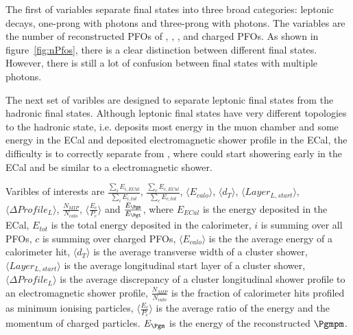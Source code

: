 \documentclass[a4paper,11pt]{article}
\begin{document}
The first of variables separate final states into three broad categories: leptonic decays, one-prong with photons and three-prong with photons. The variables are the number of reconstructed PFOs of \PGmpm, \Pepm, \PGg, \PGppm and charged PFOs. As shown in figure~\ref{fig:nPfos}, there is a clear distinction between different final states. However, there is still  a lot of confusion between final states with multiple photons.


The next set of varibles are designed to separate leptonic final states from the hadronic final states. Although leptonic final states have very different topologies to the hadronic state, i.e. \PGmpm deposits most energy in the muon chamber and some energy in the ECal and \Pepm deposited electromagnetic shower profile in the ECal, the difficulty is to correctly separate \Pepm from \PGppm, where \PGppm could start showering early in the ECal and be similar to a electromagnetic shower.

Varibles of interests are $\frac{\sum_{i}{E_{i,ECal}}}{\sum_{i}{E_{i,tot}}}$, $\frac{\sum_{c}{E_{c,ECal}}}{\sum_{c}{E_{c,tot}}}$, $\langle{E_{calo}}\rangle$, $\langle{d_{T}}\rangle$, $\langle{Layer_{L,start}}\rangle$, $\langle\Delta{Profile_{L}}\rangle$, $\frac{N_{MIP}}{N_{calo}}$,  $\langle{\frac{E_{c}}{P_{c}}}\rangle$ and  $\frac{E_{\Pmu}}{E_{\Ptau}}$, where $E_{ECal}$ is the energy deposited in the ECal,  $E_{tot}$ is the total energy deposited in the calorimeter, $i$ is summing over all PFOs, $c$ is summing over charged PFOs, $\langle{E_{calo}}\rangle$ is the the average energy of a calorimeter hit, $\langle{d_{T}}\rangle$ is the average transverse width of a cluster shower, $\langle{Layer_{L,start}}\rangle$ is the average longitudinal start layer of a cluster shower, $\langle\Delta{Profile_{L}}\rangle$ is the average discrepancy of a  cluster longitudinal shower profile to an electromagnetic shower profile, $\frac{N_{MIP}}{N_{calo}}$ is the fraction of calorimeter hits profiled as minimum ionising particles, $\langle{\frac{E_{c}}{P_{c}}}\rangle$ is the average ratio of the energy and the momentum of charged particles. $E_{\Pmu}$ is the energy of the reconstructed $\Pmupm$. 
\end{document}
